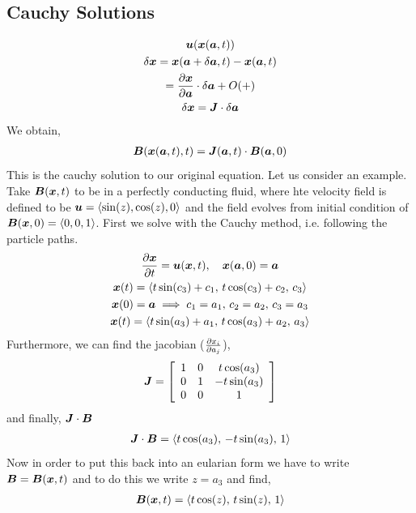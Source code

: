 \documentclass{article}
\begin{document}
\subsection{Cauchy Solutions}
\begin{gather*}
    \boldsymbol{u}(\boldsymbol{x}(\boldsymbol{a},t))\\
    \delta \boldsymbol{x} = \boldsymbol{x}(\boldsymbol{a} + \delta \boldsymbol{a}, t) - \boldsymbol{x}(\boldsymbol{a},t)\\
    = \frac{\partial \boldsymbol{x}}{\partial \boldsymbol{a}} \cdot \delta \boldsymbol{a} + O(+)\\
    \delta \boldsymbol{x} = \boldsymbol{J}\cdot\delta\boldsymbol{a}
\end{gather*}
We obtain, \
\begin{gather*}
    \boldsymbol{B}(\boldsymbol{x}(\boldsymbol{a},t),t) = \boldsymbol{J}(\boldsymbol{a},t)\cdot \boldsymbol{B}(\boldsymbol{a},0)
\end{gather*}
This is the cauchy solution to our original equation. 
Let us consider an example. Take $\boldsymbol{B}(\boldsymbol{x},t)$ to be in a perfectly conducting
fluid, where hte velocity field is defined to be $\boldsymbol{u} = \left< \sin(z),
\cos(z), 0\right>$ and the field evolves from initial condition of $\boldsymbol{B}(\boldsymbol{x}, 0) =
\left<0, 0, 1\right>$. 
First we solve with the Cauchy method, i.e. following the particle paths. 
\begin{gather*}
   \frac{\partial \boldsymbol{x}}{\partial t} = \boldsymbol{u}(\boldsymbol{x},t), \quad \boldsymbol{x}(\boldsymbol{a}, 0) = \boldsymbol{a}\\
   \boldsymbol{x}(t) = \left< t\sin(c_3) + c_1,\, t\cos(c_3) + c_2,\, c_3\right>\\
   \boldsymbol{x}(0) = \boldsymbol{a} \implies c_1 = a_1,\, c_2 = a_2,\, c_3 = a_3\\
   \boldsymbol{x}(t) = \left< t\sin(a_3) + a_1,\, t\cos(a_3) + a_2,\, a_3\right>
\end{gather*}
Furthermore, we can find the jacobian ($\frac{\partial x_i}{\partial a_j}$),
\begin{gather*}
    \boldsymbol{J} = \left[\begin{array}{c c c}
        1 & 0 & t\cos(a_3)\\
        0 & 1 & -t\sin(a_3)\\
        0 & 0 & 1
    \end{array}\right]
\end{gather*}
and finally, $\boldsymbol{J}\cdot\boldsymbol{B}$ 
\begin{gather*}
    \boldsymbol{J}\cdot\boldsymbol{B} = \left< t\cos(a_3),\, -t\sin(a_3),\, 1\right>
\end{gather*}
Now in order to put this back into an eularian form we have to write $\boldsymbol{B} =
\boldsymbol{B}(\boldsymbol{x},t)$ and to do this we write $z = a_3$ and find, 
\begin{gather*}
    \boldsymbol{B}(\boldsymbol{x},t) = \left< t\cos(z),\, t\sin(z),\, 1\right>
\end{gather*}
\end{document}
